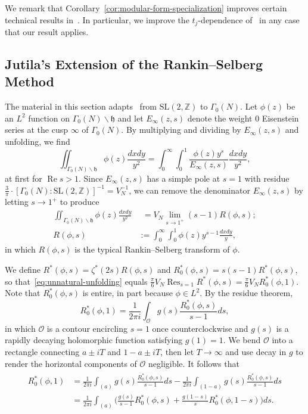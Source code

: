 \documentclass[11pt,reqno]{amsart}
\theoremstyle{plain}
\theoremstyle{definition}
\numberwithin{equation}{section}
\renewcommand{\Re}{\operatorname{Re}}
\DeclareMathOperator*{\Res}{Res}
\begin{document}
We remark that Corollary~\ref{cor:modular-form-specialization} improves certain technical results in~\cite{Kiral15}. In particular, we improve the $t_j$-dependence of~\cite[Proposition 14]{Kiral15} in any case that our result applies.

\subsection{Jutila's Extension of the Rankin--Selberg Method}

The material in this section adapts~\cite[\S{2}]{Jutila96} from $\mathrm{SL}(2,\mathbb{Z})$ to $\Gamma_0(N)$. Let $\phi(z)$ be an $L^2$ function on $\Gamma_0(N) \backslash \mathfrak{h}$ and let $E_\infty(z,s)$ denote the weight $0$ Eisenstein series at the cusp $\infty$ of $\Gamma_0(N)$. By multiplying and dividing by $E_\infty(z,s)$ and unfolding, we find
\[
		\iint_{\Gamma_0(N) \backslash \mathfrak{h}} \phi(z) \frac{dxdy}{y^2}
			= \int_0^\infty \int_0^1 \frac{\phi(z) y^s}{E_\infty(z,s)} \frac{dxdy}{y^2},
\]
at first for $\Re s > 1$. Since $E_\infty(z,s)$ has a simple pole at $s=1$ with residue $\frac{3}{\pi} \cdot [\Gamma_0(N) : \mathrm{SL}(2,\mathbb{Z}) ]^{-1} = V_N^{-1}$, we can remove the denominator $E_\infty(z,s)$ by letting $s \to 1^+$ to produce
\begin{align} \label{eq:unnatural-unfolding}
	 \iint_{\Gamma_0(N) \backslash \mathfrak{h}} \phi(z) \frac{dxdy}{y^2}
	&\phantom{:}= V_N \lim_{s \to 1^+} (s-1) R(\phi, s); \\
	R(\phi, s) &:= \int_0^\infty\int_0^1 \phi(z) y^{s-1} \frac{dxdy}{y},
\end{align}
in which $R(\phi, s)$ is the typical Rankin--Selberg transform of $\phi$.

We define $R^*(\phi,s) = \zeta^*(2s) R(\phi,s)$ and $R^*_0(\phi,s) = s(s-1)R^*(\phi,s)$, so that~\eqref{eq:unnatural-unfolding} equals $\frac{\pi}{6} V_N \Res_{s=1} R^*(\phi ,s) = \frac{\pi}{6} V_N R^*_0(\phi,1)$. Note that $R_0^*(\phi,s)$ is entire, in part because $\phi \in L^2$. By the residue theorem,
\[
	R_0^*(\phi,1) = \frac{1}{2\pi i} \int_\mathcal{O} g(s) \frac{R_0^*(\phi, s)}{s-1} ds,
\]
in which $\mathcal{O}$ is a contour encircling $s=1$ once counterclockwise and $g(s)$ is a rapidly decaying holomorphic function satisfying $g(1)=1$. We bend $\mathcal{O}$ into a rectangle connecting $a \pm i T$ and $1-a \pm iT$, then let $T \to \infty$ and use decay in $g$ to render the horizontal components of $\mathcal{O}$ negligible. It follows that
\begin{align} 
\begin{split} \label{eq:Rankin-Selberg-two-lines}
	R_0^*(\phi, 1)
		&= \frac{1}{2\pi i} \int_{(a)} g(s) \frac{R_0^*(\phi, s)}{s-1} ds
			- \frac{1}{2\pi i} \int_{(1-a)} g(s) \frac{R_0^*(\phi, s)}{s-1} ds \\
		&= \frac{1}{2\pi i} \int_{(a)} 
			\Big(\frac{g(s)}{s-1}R_0^*(\phi, s) + \frac{g(1-s)}{s} R_0^*(\phi, 1-s) \Big) ds.
\end{split}
\end{align}
\end{document}
